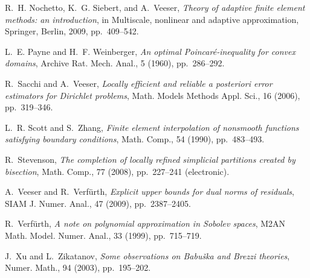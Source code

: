 \documentclass[a4paper]{amsart}
\numberwithin{equation}{section}
\theoremstyle{plain}
\theoremstyle{definition}
\begin{document}
\begin{thebibliography}{10}
{\sc R.~H. Nochetto, K.~G. Siebert, and A.~Veeser}, {\em Theory of adaptive
  finite element methods: an introduction}, in Multiscale, nonlinear and
  adaptive approximation, Springer, Berlin, 2009, pp.~409--542.

{\sc L.~E. Payne and H.~F. Weinberger}, {\em An optimal
  {P}oincar{\'e}-inequality for convex domains}, Archive Rat. Mech. Anal., 5
  (1960), pp.~286--292.

{\sc R.~Sacchi and A.~Veeser}, {\em Locally efficient and reliable a posteriori
  error estimators for {D}irichlet problems}, Math. Models Methods Appl. Sci.,
  16 (2006), pp.~319--346.

{\sc L.~R. Scott and S.~Zhang}, {\em Finite element interpolation of nonsmooth
  functions satisfying boundary conditions}, Math. Comp., 54 (1990),
  pp.~483--493.

{\sc R.~Stevenson}, {\em The completion of locally refined simplicial
  partitions created by bisection}, Math. Comp., 77 (2008), pp.~227--241
  (electronic).

{\sc A.~Veeser and R.~Verf\"urth}, {\em Explicit upper bounds for dual norms of
  residuals}, SIAM J. Numer. Anal., 47 (2009), pp.~2387--2405.

{\sc R.~Verf{\"u}rth}, {\em A note on polynomial approximation in {S}obolev
  spaces}, M2AN Math. Model. Numer. Anal., 33 (1999), pp.~715--719.

{\sc J.~Xu and L.~Zikatanov}, {\em Some observations on {B}abu\v ska and
  {B}rezzi theories}, Numer. Math., 94 (2003), pp.~195--202.
\end{thebibliography}
\end{document}
